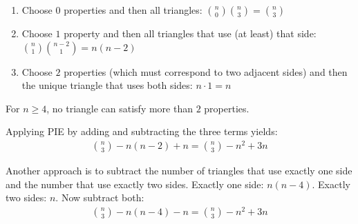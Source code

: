 \begin{enumerate}
\item Choose $0$ properties and then all triangles: 
$\binom{n}{0}\binom{n}{3}=\binom{n}{3}$
\item Choose $1$ property and then all triangles that use (at least) that side: 
$\binom{n}{1}\binom{n-2}{1}=n(n-2)$
\item Choose $2$ properties (which must correspond to two adjacent sides) and then the unique triangle that uses both sides: $n\cdot 1=n$
\end{enumerate}

For $n \ge 4$, no triangle can satisfy more than $2$ properties.

Applying PIE by adding and subtracting the three terms yields:
\begin{align*}
\binom{n}{3} - n(n-2)+n 
  = \binom{n}{3} - n^2 + 3n
\end{align*}

Another approach is to subtract the number of triangles that use exactly one side and the number that use exactly two sides. Exactly one side: $n(n-4)$. Exactly two sides: $n$.  Now subtract both:
\begin{align*}
\binom{n}{3} -n(n-4) - n
  = \binom{n}{3} - n^2 + 3n
\end{align*}
